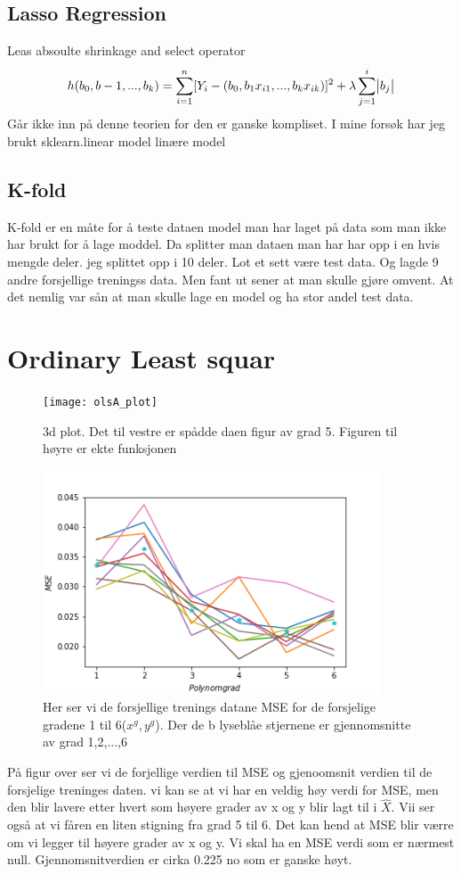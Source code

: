 \documentclass[norsk,a4paper,12pt]{article}
\begin{document}
\subsection*{Lasso Regression}
Leas absoulte shrinkage and select operator
\[h(b_0,b-1,...,b_k)=\sum^{n}_{i=1}[Y_i -(b_0,b_{1}x_{i1},...,b_{k}x_{ik})]^2 + \lambda \sum_{j=1}^{i}\abs{b_j}\]
Går ikke inn på denne teorien for den er ganske kompliset. I mine forsøk har jeg brukt sklearn.linear model linære model

\subsection*{K-fold}
K-fold er en måte for å teste dataen model man har laget på data som man ikke har brukt  for å lage moddel. Da splitter man dataen man har har opp i en hvis mengde deler. jeg splittet opp i 10 deler. Lot et sett være test data. Og lagde 9 andre forsjellige treningss data. Men fant ut sener at man skulle gjøre omvent. At det nemlig var sån at man skulle lage en model  og ha stor andel test data. 
\section*{ Ordinary Least squar}
\begin{figure}[H]
\texttt{[image: olsA\_plot]}
\caption{3d plot. Det til vestre er spådde daen figur av grad 5. Figuren til høyre er ekte funksjonen}
\end{figure}
\begin{figure}[H]
\includegraphics[width=100mm]{MSE}
\caption{Her ser vi de forsjellige trenings datane MSE for de forsjelige gradene 1 til 6($x^g,y^g$). Der de b lyseblåe stjernene er gjennomsnitte av grad 1,2,...,6  }
\end{figure}
På figur over ser vi de forjellige verdien til MSE og gjenoomsnit verdien til de forsjelige treninges daten. vi kan se at vi har en veldig høy verdi for MSE, men den blir lavere etter hvert som høyere grader av x og y blir lagt til i $\hat{X}$. Vii ser også at vi fåren en liten stigning fra grad 5 til 6. Det kan hend at  MSE blir værre om vi legger til høyere grader av x og y. Vi skal ha en MSE verdi som er nærmest null. Gjennomsnitverdien er cirka 0.225 no som er ganske høyt.
\end{document}
